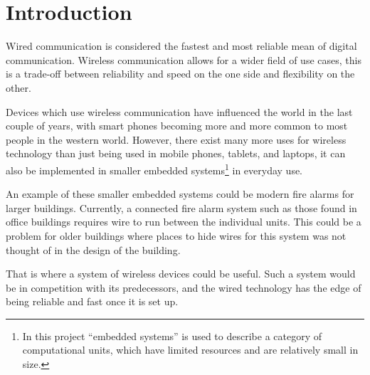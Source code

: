 \chapter{Introduction}
\vspace{-20pt}
Wired communication is considered the fastest and  most reliable mean of digital communication.
Wireless communication allows for a wider field of use cases, this is a trade-off between reliability and speed on the one side and flexibility on the other. \cite{wirelessTradeoffs}

Devices which use wireless communication have influenced the world in the last couple of years, with smart phones becoming more and more common to most people in the western world. \cite{2013-SmartPhoneUse}
However, there exist many more uses for wireless technology than just being used in mobile phones, tablets, and laptops, it can also be implemented in smaller embedded systems\footnote{In this project \enquote{embedded systems} is used to describe a category of computational units, which have limited resources and are relatively small in size. } in everyday use.



An example of these smaller embedded systems could be modern fire alarms for larger buildings.
Currently, a connected fire alarm system such as those found in office buildings requires wire to run between the individual units.
This could be a problem for older buildings where places to hide wires for this system was not thought of in the design of the building.

That is where a system of wireless devices could be useful. 
Such a system would be in competition with its predecessors, and the wired technology has the edge of being reliable and fast once it is set up. 

